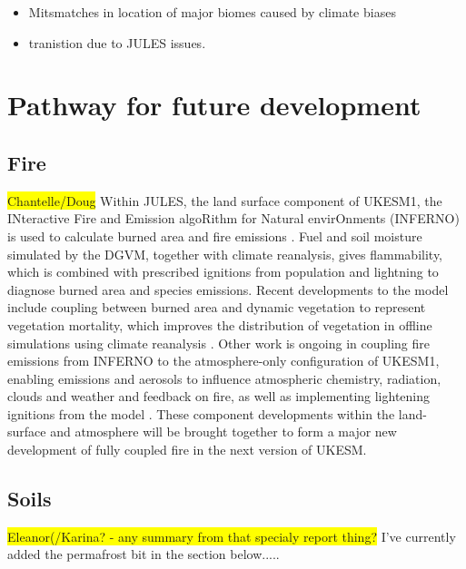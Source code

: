 \documentclass[bg, manuscript]{copernicus}
\newcommand{\hilight}[1]{\colorbox{yellow}{#1}}
\begin{document}
\begin{itemize}
    \item Mitsmatches in location of major biomes caused by climate biases
    \item tranistion due to JULES issues.
\end{itemize}



\section{Pathway for future development}

\subsection{Fire}
\hilight{Chantelle/Doug}
Within JULES, the land surface component of UKESM1, the INteractive Fire and Emission algoRithm for Natural envirOnments (INFERNO) is used to calculate burned area and fire emissions \citep{Mangeon2016}. Fuel and soil moisture simulated by the DGVM, together with climate reanalysis, gives flammability, which is combined with prescribed ignitions from population and lightning to diagnose burned area and species emissions. Recent developments to the model include coupling between burned area and dynamic vegetation to represent vegetation mortality, which improves the distribution of vegetation in offline simulations using climate reanalysis \citep{Burton2019}. Other work is ongoing in coupling fire emissions from INFERNO to the atmosphere-only configuration of UKESM1, enabling emissions and aerosols to influence atmospheric chemistry, radiation, clouds and weather and feedback on fire, as well as implementing lightening ignitions from the model \citep{Joao2020}. These component developments within the land-surface and atmosphere will be brought together to form a major new development of fully coupled fire in the next version of UKESM. 

\subsection{Soils}
\hilight{Eleanor(/Karina? - any summary from that specialy report thing?}  I've currently added the permafrost bit in the section below.....
\end{document}
